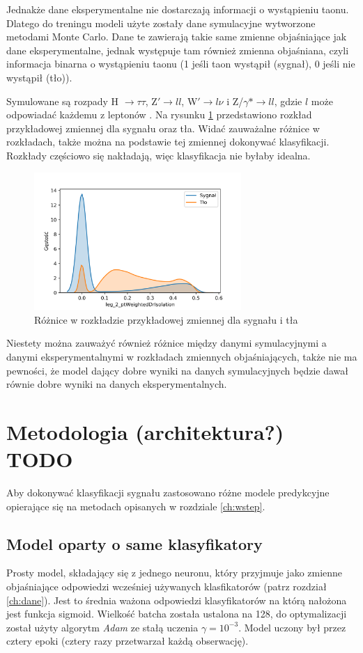 \documentclass{pracalicmgr}
\begin{document}
	Jednakże dane eksperymentalne nie dostarczają informacji o wystąpieniu taonu. Dlatego do treningu modeli użyte zostały dane symulacyjne wytworzone metodami Monte Carlo. Dane te zawierają takie same zmienne objaśniające jak dane eksperymentalne, jednak występuje tam również zmienna objaśniana, czyli informacja binarna o wystąpieniu taonu (1 jeśli taon wystąpił (sygnał), 0 jeśli nie wystąpił (tło)).
	
	Symulowane są rozpady H $\rightarrow\tau\tau$, Z$'\rightarrow ll$, W$'\rightarrow l\nu$ i Z/$\gamma* \rightarrow ll$, gdzie $l$ może odpowiadać każdemu z leptonów \cite{tauid13}. Na rysunku \ref{fig:diff} przedstawiono rozkład przykładowej zmiennej dla sygnału oraz tła. Widać zauważalne różnice w rozkładach, także można na podstawie tej zmiennej dokonywać klasyfikacji. Rozkłady częściowo się nakładają, więc klasyfikacja nie byłaby idealna.
	
	
	\begin{figure}[H]
	\centering
	\includegraphics[width=0.7\textwidth]{difference.png}
	\caption{Różnice w rozkładzie przykładowej zmiennej dla sygnału i tła}
	\label{fig:diff}
	\end{figure}
		
	Niestety można zauważyć również różnice między danymi symulacyjnymi a danymi eksperymentalnymi w rozkładach zmiennych objaśniających, także nie ma pewności, że model dający dobre wyniki na danych symulacyjnych będzie dawał równie dobre wyniki na danych eksperymentalnych.		
		
    \chapter{Metodologia (architektura?) TODO}
	Aby dokonywać klasyfikacji sygnału zastosowano różne modele predykcyjne opierające się na metodach opisanych w rozdziale \ref{ch:wstep}.
	\section{Model oparty o same klasyfikatory}
	\label{sec:mod1}
	Prosty model, składający się z jednego neuronu, który przyjmuje jako zmienne objaśniające odpowiedzi wcześniej używanych klasfikatorów (patrz rozdział \ref{ch:dane}). Jest to średnia ważona odpowiedzi klasyfikatorów na którą nałożona jest funkcja sigmoid. Wielkość batcha została ustalona na 128, do optymalizacji został użyty algorytm \textit{Adam} ze stałą uczenia $\gamma = 10^{-3}$. Model uczony był przez cztery epoki (cztery razy przetwarzał każdą obserwację).
\end{document}
